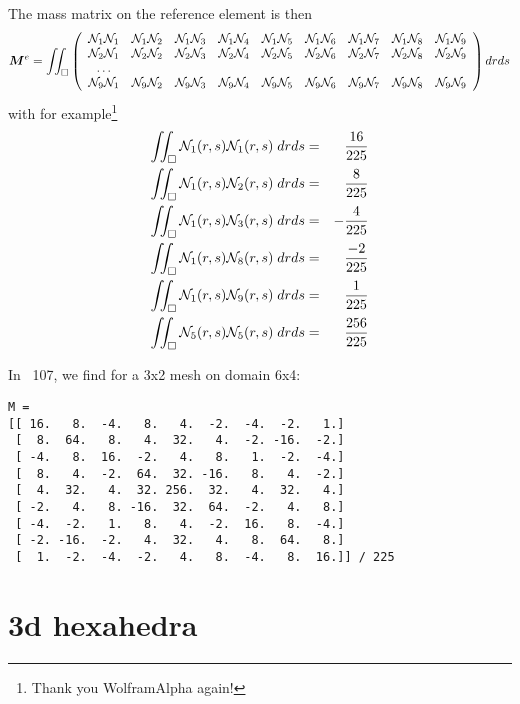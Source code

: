 The mass matrix on the reference element is then
\[
{\bm M}^e =
\iint_\square
\left(
\begin{array}{ccccccccc}
{\mathcal{N}}_1 {\mathcal{N}}_1 & {\mathcal{N}}_1 {\mathcal{N}}_2 & {\mathcal{N}}_1 {\mathcal{N}}_3 & {\mathcal{N}}_1 {\mathcal{N}}_4 & {\mathcal{N}}_1 {\mathcal{N}}_5 & {\mathcal{N}}_1 {\mathcal{N}}_6 & {\mathcal{N}}_1 {\mathcal{N}}_7 & {\mathcal{N}}_1 {\mathcal{N}}_8 & {\mathcal{N}}_1 {\mathcal{N}}_9 \\ 
{\mathcal{N}}_2 {\mathcal{N}}_1 & {\mathcal{N}}_2 {\mathcal{N}}_2 & {\mathcal{N}}_2 {\mathcal{N}}_3 & {\mathcal{N}}_2 {\mathcal{N}}_4 & {\mathcal{N}}_2 {\mathcal{N}}_5 & {\mathcal{N}}_2 {\mathcal{N}}_6 & {\mathcal{N}}_2 {\mathcal{N}}_7 & {\mathcal{N}}_2 {\mathcal{N}}_8 & {\mathcal{N}}_2 {\mathcal{N}}_9 \\ 
\dots \\
{\mathcal{N}}_9 {\mathcal{N}}_1 & {\mathcal{N}}_9 {\mathcal{N}}_2 & {\mathcal{N}}_9 {\mathcal{N}}_3 & {\mathcal{N}}_9 {\mathcal{N}}_4 & {\mathcal{N}}_9 {\mathcal{N}}_5 & {\mathcal{N}}_9 {\mathcal{N}}_6 & {\mathcal{N}}_9 {\mathcal{N}}_7 & {\mathcal{N}}_9 {\mathcal{N}}_8 & {\mathcal{N}}_9 {\mathcal{N}}_9 
\end{array}
\right)
dr ds
\]
with for example\footnote{Thank you WolframAlpha again!}
\begin{eqnarray}
\iint_\square {\mathcal{N}}_1(r,s) {\mathcal{N}}_1(r,s) \; drds &=&  \frac{16}{225} \\
\iint_\square {\mathcal{N}}_1(r,s) {\mathcal{N}}_2(r,s) \; drds &=& \frac{8}{225} \\ 
\iint_\square {\mathcal{N}}_1(r,s) {\mathcal{N}}_3(r,s) \; drds &=&  -\frac{4}{225} \\
\iint_\square {\mathcal{N}}_1(r,s) {\mathcal{N}}_8(r,s) \; drds &=&  \frac{-2}{225} \\
\iint_\square {\mathcal{N}}_1(r,s) {\mathcal{N}}_9(r,s) \; drds &=&  \frac{1}{225} \\
\iint_\square {\mathcal{N}}_5(r,s) {\mathcal{N}}_5(r,s) \; drds &=&  \frac{256}{225} \\
\end{eqnarray}

In \stone~107, we find for a 3x2 mesh on domain 6x4:
\begin{verbatim}
M = 
[[ 16.   8.  -4.   8.   4.  -2.  -4.  -2.   1.]
 [  8.  64.   8.   4.  32.   4.  -2. -16.  -2.]
 [ -4.   8.  16.  -2.   4.   8.   1.  -2.  -4.]
 [  8.   4.  -2.  64.  32. -16.   8.   4.  -2.]
 [  4.  32.   4.  32. 256.  32.   4.  32.   4.]
 [ -2.   4.   8. -16.  32.  64.  -2.   4.   8.]
 [ -4.  -2.   1.   8.   4.  -2.  16.   8.  -4.]
 [ -2. -16.  -2.   4.  32.   4.   8.  64.   8.]
 [  1.  -2.  -4.  -2.   4.   8.  -4.   8.  16.]] / 225
\end{verbatim}







\newpage
\section{3d hexahedra}


